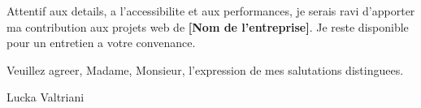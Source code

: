 \documentclass[11pt,a4paper]{article}
\newcommand{\entreprise}{[Nom de l'entreprise]}
\begin{document}
Attentif aux details, a l'accessibilite et aux performances, je serais ravi d'apporter ma contribution aux projets web de \textbf{\entreprise}. Je reste disponible pour un entretien a votre convenance.

\vspace{18pt}

Veuillez agreer, Madame, Monsieur, l'expression de mes salutations distinguees.

\vspace{28pt}

\noindent Lucka Valtriani
\end{document}
